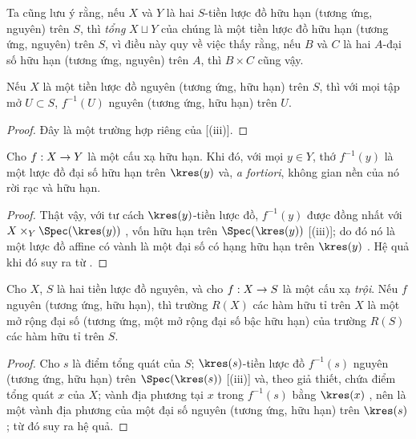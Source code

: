 \documentclass[oneside,10pt]{amsart}
\makeatletter
\newcommand{\ega@arrow}[2]{\mathchoice{#1}{#2}{#2}{#2}}
\renewcommand{\to}{\ega@arrow{\longrightarrow}{\rightarrow}}
\let\EGAOriginalLabel\label
\renewcommand{\label}[1]{\phantomsection\EGAOriginalLabel{#1}}
\makeatother
\begin{document}
Ta cũng lưu ý rằng, nếu $X$ và $Y$ là hai $S$-tiền lược đồ hữu hạn (tương ứng, nguyên) trên $S$, thì \emph{tổng} $X\sqcup Y$ của chúng là một tiền lược đồ hữu hạn (tương ứng, nguyên) trên $S$, vì điều này quy về việc thấy rằng, nếu $B$ và $C$ là hai $A$-đại số hữu hạn (tương ứng, nguyên) trên $A$, thì $B\times C$ cũng vậy.

\begin{corollary}[6.1.6]
\label{II.6.1.6}
Nếu $X$ là một tiền lược đồ nguyên (tương ứng, hữu hạn) trên $S$, thì với mọi tập mở $U\subset S$, $f^{-1}(U)$ nguyên (tương ứng, hữu hạn) trên $U$.
\end{corollary}

\begin{proof}
Đây là một trường hợp riêng của [(iii)].
\end{proof}

\begin{corollary}[6.1.7]
\label{II.6.1.7}
Cho $f:X\to Y$ là một cấu xạ hữu hạn.
Khi đó, với mọi $y\in Y$, thớ $f^{-1}(y)$ là một lược đồ đại số hữu hạn trên $\kres(y)$ và, \emph{a fortiori}, không gian nền của nó rời rạc và hữu hạn.
\end{corollary}

\begin{proof}
Thật vậy, với tư cách $\kres(y)$-tiền lược đồ, $f^{-1}(y)$ được đồng nhất với $X\times_Y\Spec(\kres(y))$ , vốn hữu hạn trên $\Spec(\kres(y))$ [(iii)];
do đó nó là một lược đồ affine có vành là một đại số có hạng hữu hạn trên $\kres(y)$ .
Hệ quả khi đó suy ra từ .
\end{proof}

\begin{corollary}[6.1.8]
\label{II.6.1.8}
Cho $X$, $S$ là hai tiền lược đồ nguyên, và cho $f:X\to S$ là một cấu xạ \emph{trội}.
Nếu $f$ nguyên (tương ứng, hữu hạn), thì trường $R(X)$ các hàm hữu tỉ trên $X$ là một mở rộng đại số (tương ứng, một mở rộng đại số bậc hữu hạn) của trường $R(S)$ các hàm hữu tỉ trên $S$.
\end{corollary}

\begin{proof}
Cho $s$ là điểm tổng quát của $S$;
$\kres(s)$-tiền lược đồ $f^{-1}(s)$ nguyên (tương ứng, hữu hạn) trên $\Spec(\kres(s))$ [(iii)] và, theo giả thiết, chứa điểm tổng quát $x$ của $X$;
vành địa phương tại $x$ trong $f^{-1}(s)$ bằng $\kres(x)$ , nên là một vành địa phương của một đại số nguyên (tương ứng, hữu hạn) trên $\kres(s)$ ; từ đó suy ra hệ quả.
\end{proof}
\end{document}
